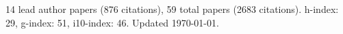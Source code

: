 14 lead author papers (876 citations),
59 total papers (2683 citations).\newline
h-index: 29, g-index: 51, i10-index: 46. Updated \today.